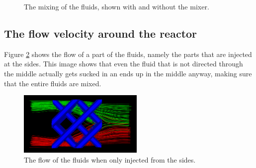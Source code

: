 \documentclass{article}
\begin{document}
\begin{figure}[ht]
\centering
{}
\caption{The mixing of the fluids, shown with and without the mixer.}
\label{fluids}
\end{figure}  

\subsection*{The flow velocity around the reactor}
Figure \ref{around} shows the flow of a part of the fluids, namely the parts that are injected at the sides. This image shows that even the fluid that is not directed through the middle actually gets sucked in an ends up in the middle anyway, making sure that the entire fluids are mixed.  

\begin{figure}[ht]
\centering
\includegraphics[width=6cm]{SVVR_around.png}
\caption{The flow of the fluids when only injected from the sides.}
\label{around}
\end{figure}  
\end{document}
